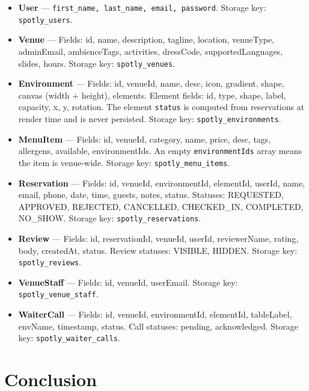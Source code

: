 \documentclass[12pt,a4paper,oneside]{report}
\begin{document}
\begin{itemize}[leftmargin=1.5em, topsep=4pt, itemsep=3pt]
  \item \textbf{User} ---
    \texttt{first\_name, last\_name, email, password}.
    Storage key: \texttt{spotly\_users}.

  \item \textbf{Venue} ---
    Fields: id, name, description, tagline, location, venueType, adminEmail,
    ambienceTags, activities, dressCode, supportedLanguages, slides, hours.
    Storage key: \texttt{spotly\_venues}.

  \item \textbf{Environment} ---
    Fields: id, venueId, name, desc, icon, gradient, shape, canvas (width +
    height), elements.
    Element fields: id, type, shape, label, capacity, x, y, rotation.
    The element \texttt{status} is computed from reservations at render time
    and is never persisted.
    Storage key: \texttt{spotly\_environments}.

  \item \textbf{MenuItem} ---
    Fields: id, venueId, category, name, price, desc, tags, allergens,
    available, environmentIds.
    An empty \texttt{environmentIds} array means the item is venue-wide.
    Storage key: \texttt{spotly\_menu\_items}.

  \item \textbf{Reservation} ---
    Fields: id, venueId, environmentId, elementId, userId, name, email,
    phone, date, time, guests, notes, status.
    Statuses: REQUESTED, APPROVED, REJECTED, CANCELLED,
    CHECKED\_IN, COMPLETED, NO\_SHOW.
    Storage key: \texttt{spotly\_reservations}.

  \item \textbf{Review} ---
    Fields: id, reservationId, venueId, userId, reviewerName, rating,
    body, createdAt, status.
    Review statuses: VISIBLE, HIDDEN.
    Storage key: \texttt{spotly\_reviews}.

  \item \textbf{VenueStaff} ---
    Fields: id, venueId, userEmail.
    Storage key: \texttt{spotly\_venue\_staff}.

  \item \textbf{WaiterCall} ---
    Fields: id, venueId, environmentId, elementId, tableLabel, envName,
    timestamp, status.
    Call statuses: pending, acknowledged.
    Storage key: \texttt{spotly\_waiter\_calls}.
\end{itemize}

\section{Conclusion}
\end{document}
